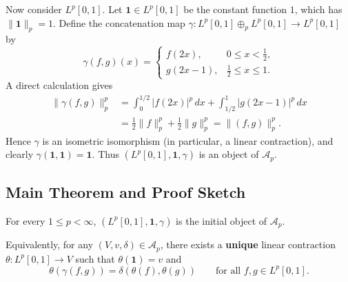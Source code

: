 Now consider $L^p[0,1]$. Let $\mathbf{1} \in L^p[0,1]$ be the constant function $1$, which has $\|\mathbf{1}\|_p = 1$. Define the concatenation map $\gamma : L^p[0,1] \oplus_p L^p[0,1] \to L^p[0,1]$ by
\[
    \gamma(f, g)(x) =
    \begin{cases}
        f(2x), & 0 \le x < \tfrac{1}{2}, \\
        g(2x - 1), & \tfrac{1}{2} \le x \le 1.
    \end{cases}
\]
A direct calculation gives
\[
    \begin{aligned}
 \|\gamma(f,g)\|_p^p
 &=\int_0^{1/2}|f(2x)|^p\,dx+
      \int_{1/2}^1|g(2x-1)|^p\,dx\\
 &=\tfrac12\|f\|_p^p+\tfrac12\|g\|_p^p
 =\|(f,g)\|_p^p.
\end{aligned}
\]
Hence $\gamma$ is an isometric isomorphism (in particular, a linear contraction), and clearly $\gamma(\mathbf{1}, \mathbf{1}) = \mathbf{1}$. Thus $(L^p[0,1], \mathbf{1}, \gamma)$ is an object of $\mathcal{A}_p$.

\subsection{Main Theorem and Proof Sketch}

\begin{theorem}
For every $1 \le p < \infty$, $(L^p[0,1], \mathbf{1}, \gamma)$ is the initial object of $\mathcal{A}_p$.
\end{theorem}

Equivalently, for any $(V, v, \delta) \in \mathcal{A}_p$, there exists a \textbf{unique} linear contraction $\theta : L^p[0,1] \to V$ such that $\theta(\mathbf{1}) = v$ and
\[
    \theta(\gamma(f, g)) = \delta(\theta(f), \theta(g)) \qquad \text{for all } f, g \in L^p[0,1].
\]

